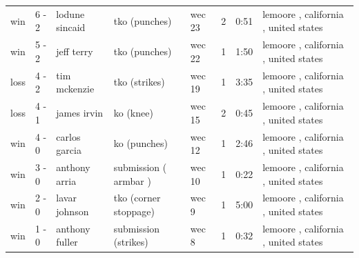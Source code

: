 \documentclass{article}
\begin{document}
\begin{tabular}{llllllll}
win & 6 - 2 & lodune sincaid & tko (punches) & wec 23 & 2 & 0:51 & lemoore , california , united states \\
win & 5 - 2 & jeff terry & tko (punches) & wec 22 & 1 & 1:50 & lemoore , california , united states \\
loss & 4 - 2 & tim mckenzie & tko (strikes) & wec 19 & 1 & 3:35 & lemoore , california , united states \\
loss & 4 - 1 & james irvin & ko (knee) & wec 15 & 2 & 0:45 & lemoore , california , united states \\
win & 4 - 0 & carlos garcia & ko (punches) & wec 12 & 1 & 2:46 & lemoore , california , united states \\
win & 3 - 0 & anthony arria & submission ( armbar ) & wec 10 & 1 & 0:22 & lemoore , california , united states \\
win & 2 - 0 & lavar johnson & tko (corner stoppage) & wec 9 & 1 & 5:00 & lemoore , california , united states \\
win & 1 - 0 & anthony fuller & submission (strikes) & wec 8 & 1 & 0:32 & lemoore , california , united states \\
\bottomrule
\end{tabular}
\end{document}
